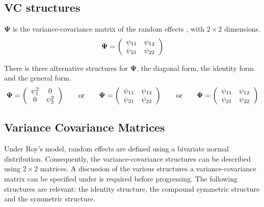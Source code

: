 \documentclass[12pt, a4paper]{report}
\theoremstyle{plain}
\theoremstyle{definition}
\theoremstyle{remark}
\begin{document}
		\subsection{VC structures}
		$\boldsymbol{\Psi}$ is the variance-covariance matrix of the random effects ,
		with $2 \times 2$ dimensions.
		\begin{equation}
		\boldsymbol{\Psi} =
		\left(%
		\begin{array}{c c}
		\psi_{11} & \psi_{12}  \\
		\psi_{21} & \psi_{22}  \\
		\end{array}%
		\right)
		\end{equation}
		
		There is three alternative structures for
		$\boldsymbol{\Psi}$, the diagonal form, the identity form and the general form.
		\[
		\boldsymbol{\Psi} =
		\left(%
		\begin{array}{c c}
		\psi^2_1 & 0  \\
		0 & \psi^2_2  \\
		\end{array}%
		\right)\qquad \mathrm{or} \qquad \boldsymbol{\Psi} =
		\left(%
		\begin{array}{c c}
		\psi_{11} & \psi_{12}  \\
		\psi_{21} & \psi_{22}  \\
		\end{array}%
		\right)
		\qquad \mathrm{or} \qquad \boldsymbol{\Psi} =
		\left(%
		\begin{array}{c c}
		\psi_{11} & \psi_{12}  \\
		\psi_{21} & \psi_{22}  \\
		\end{array}%
		\right)
		\]
		
		
	
	
	
	\newpage
	\subsection{Variance Covariance Matrices }
	
	Under Roy's model, random effects are defined using a bivariate normal distribution. Consequently, the variance-covariance structures can be described using $2 \times 2$  matrices. A discussion of the various structures a variance-covariance matrix can be specified under is required before progressing. The following structures are relevant: the identity structure, the compound symmetric structure and the symmetric structure.
	
\end{document}
